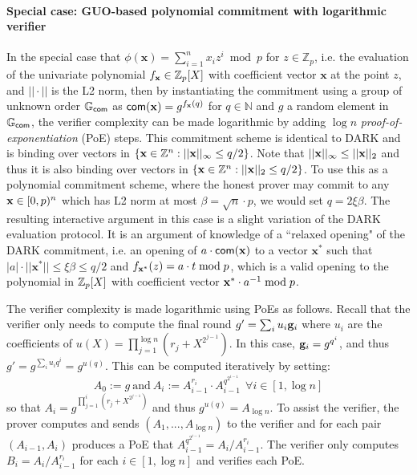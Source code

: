 \paragraph{Special case: GUO-based polynomial commitment with logarithmic verifier} In the special case that $\phi(\mathbf{x})= \sum_{i = 1}^n x_i z^i \bmod p$ for $z \in \mathbb{Z}_p$, i.e. the evaluation of the univariate polynomial $f_\mathbf{x} \in \mathbb{Z}_p[X]$ with coefficient vector $\mathbf{x}$ at the point $z$, and $|| \cdot ||$ is the L2 norm, then by instantiating the commitment using a group of unknown order $\mathbb{G}_{\mathsf{com}}$ as $\mathsf{com}(\mathbf{x}) = g^{f_\mathbf{x}(q)}$ for $q \in \mathbb{N}$ and $g$ a random element in $\mathbb{G}_{\mathsf{com}}$, the verifier complexity can be made logarithmic by adding $\log n$ \emph{proof-of-exponentiation} (PoE) steps. This commitment scheme is identical to DARK and is binding over vectors in $\{\mathbf{x} \in \mathbb{Z}^n: ||\mathbf{x}||_\infty \leq q/2 \}$. Note that $||\mathbf{x}||_\infty \leq ||\mathbf{x}||_2$ and thus it is also binding over vectors in $\{\mathbf{x} \in \mathbb{Z}^n: ||\mathbf{x}||_2 \leq q/2 \}$. To use this as a polynomial commitment scheme, where the honest prover may commit to any $\mathbf{x} \in [0, p)^n$ which has L2 norm at most $\beta = \sqrt{n} \cdot p$, we would set $q = 2\xi \beta$. The resulting interactive argument in this case is a slight variation of the DARK evaluation protocol. It is an argument of knowledge of a ``relaxed opening" of the DARK commitment, i.e. an opening of $a \cdot \mathsf{com}(\mathbf{x})$ to a vector $\mathbf{x}^*$ such that $|a| \cdot ||\mathbf{x}^*||\leq \xi \beta \leq q/2$ and $f_{\mathbf{x}^*}(z) = a \cdot t \bmod p$, which is a valid opening to the polynomial in $\mathbb{Z}_p[X]$ with coefficient vector $\mathbf{x}^* \cdot a^{-1} \bmod p$. 

The verifier complexity is made logarithmic using PoEs as follows. Recall that the verifier only needs to compute the final round $g' = \sum_i u_i \mathbf{g}_i$ where $u_i$ are the coefficients of $u(X) = \prod_{j = 1}^{\log n} (r_j + X^{2^{j-1}})$. In this case, $\mathbf{g}_i = g^{q^i}$, and thus $g' = g^{\sum_i u_i q^i} = g^{u(q)}$. 
This can be computed iteratively by setting: 
$$A_0 := g \ \text{and} \ A_i := A_{i-1}^{r_i} \cdot A_{i-1}^{q^{2^{i-1}}} \ \ \forall i \in [1, \log n]$$
so that $A_i = g^{\prod_{j = 1}^{i} (r_j + X^{2^{j-1}})}$ and thus $g^{u(q)} = A_{\log n}$. To assist the verifier, the prover computes and sends $(A_1,...,A_{\log n})$ to the verifier and for each pair $(A_{i-1}, A_i)$ produces a PoE that $A_{i-1}^{q^{2^{i-1}}} = A_i/A_{i-1}^{r_i}$. The verifier only computes $B_i = A_i/A_{i-1}^{r_i}$ for each $i \in [1, \log n]$ and verifies each PoE. 

